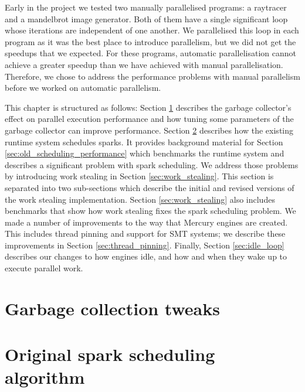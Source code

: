

Early in the project
we tested two manually parallelised programs:
a raytracer and a mandelbrot image generator.
Both of them have a single significant loop
whose iterations are independent of one another.
We parallelised this loop in each program as it was the best place to
introduce parallelism,
but we did not get the speedups that we expected.
For these programs, automatic parallelisation cannot achieve
a greater speedup than we have achieved with manual parallelisation.
Therefore,
we chose to address the performance problems with manual parallelism
before we worked on automatic parallelism.

This chapter is structured as follows:
Section \ref{sec:gc} describes the garbage collector's effect on parallel
execution performance and how tuning some parameters of the garbage
collector can improve performance.
Section \ref{sec:old_scheduling} describes how the existing runtime
system schedules sparks.
It provides background material for Section
\ref{sec:old_scheduling_performance}
which benchmarks the runtime system and describes a significant problem with
spark scheduling.
We address those problems by introducing work stealing in Section
\ref{sec:work_stealing}.
This section is separated into two sub-sections
which describe the initial and revised versions of the work stealing
implementation.
Section \ref{sec:work_stealing} also includes benchmarks that show
how work stealing fixes the spark scheduling problem.
We made a number of improvements to the way that Mercury engines are created.
This includes thread pinning and support for SMT systems;
we describe these improvements in Section \ref{sec:thread_pinning}.
Finally, Section \ref{sec:idle_loop} describes our changes to how engines
idle,
and how and when they wake up to execute parallel work.

\section{Garbage collection tweaks}
\label{sec:gc}




\section{Original spark scheduling algorithm}
\label{sec:old_scheduling}


